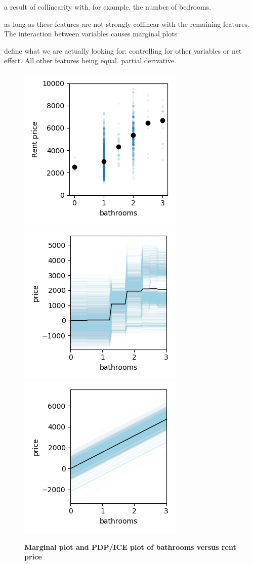 \documentclass[12pt]{article}
\begin{document}
a result of collinearity with, for example, the number of bedrooms.
 
as long as these features are not strongly collinear with the remaining features. The interaction between variables causes marginal plots


define what we are actually looking for: controlling for other variables or net effect. All other features being equal. partial derivative.



 \begin{figure}[htbp]
\begin{center}
\includegraphics[scale=0.7]{images/baths_vs_price.png}
\includegraphics[scale=0.7]{images/baths_vs_price_pdp.png}
\includegraphics[scale=0.7]{images/baths_vs_price_pdp_lm.png}
\caption{{\bf  Marginal plot and PDP/ICE plot of bathrooms versus rent price}}
\label{fig:baths_price}
\end{center}
\end{figure}
\end{document}
